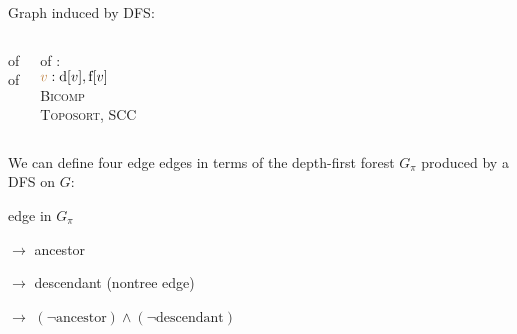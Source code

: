 
\begin{frame}{} 
  \centerline{\large Graph  induced by DFS:}

  \vspace{0.50cm}
  \begin{columns}
      \begin{center}
	 of  \\[15pt]

	 of 
      \end{center}
    \pause
      \begin{center}
	 of : \\[15pt]

	$\textcolor{brown}{v}: \text{d}[v], \text{f}[v]$ \\[10pt]

	 \textsc{Bicomp} \\[10pt]

	 \textsc{Toposort}, \textsc{SCC}
      \end{center}
  \end{columns}
\end{frame}

\begin{frame}{}
  \begin{definition}
    We can define four edge edges in terms of the depth-first forest $G_{\pi}$ produced by a DFS on $G$:
    \begin{description}
      \setlength{\itemsep}{5pt}
      \item[Tree edge:] edge in $G_{\pi}$
      \item[Back edge:] $\to$ ancestor
      \item[Forward edge:] $\to$ descendant (nontree edge)
      \item[Cross edge:] $\to$ $(\lnot \text{ancestor}) \land (\lnot \text{descendant})$
    \end{description}
  \end{definition}

\end{frame}

